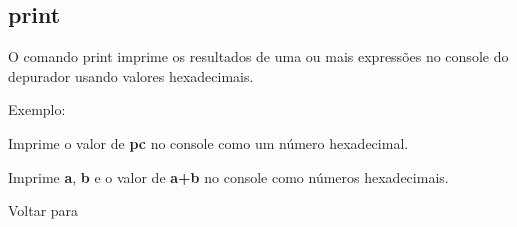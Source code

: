 \documentclass[letterpaper,10pt,brazil]{sphinxmanual}
\begin{document}
\subsection{print}
\label{debugger/general:print}\label{debugger/general:debugger-command-print}
\begin{DUlineblock}{0em}
\item[] O comando print imprime os resultados de uma ou mais expressões no console do depurador usando valores hexadecimais.
\item[] 
\item[] Exemplo:
\item[] 
\item[]
\begin{DUlineblock}{\DUlineblockindent}
\item[] 
\item[] 
\end{DUlineblock}
\item[] Imprime o valor de \textbf{pc} no console como um número hexadecimal.
\item[] Imprime \textbf{a}, \textbf{b} e o valor de \textbf{a+b} no console como números hexadecimais.
\item[] 
\item[] Voltar para {\hyperref[debugger/general:debugger\string-general\string-list]{}}
\end{DUlineblock}
\begin{quote}
\label{debugger/general:debugger-command-printf}\end{quote}
\end{document}
